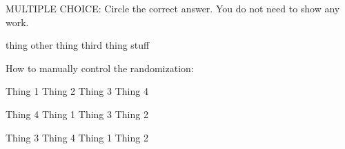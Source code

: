 
\question[2] MULTIPLE CHOICE: Circle the correct answer. You do not need to show any work.
\begin{randomizechoices}
    \choice thing
    \choice other thing
    \correctchoice third thing 
    \choice stuff
\end{randomizechoices}


\question[2] How to manually control the randomization:
\ifnum{}
\begin{choices}
    \choice Thing 1
    \choice Thing 2
    \choice Thing 3
    \correctchoice Thing 4
\end{choices}
\fi\ifnum{}
\begin{choices}
    \correctchoice Thing 4
    \choice Thing 1
    \choice Thing 3
    \choice Thing 2
\end{choices}
\fi\ifnum{}
\begin{choices}
    \choice Thing 3
    \correctchoice Thing 4
    \choice Thing 1
    \choice Thing 2
\end{choices}
\fi

